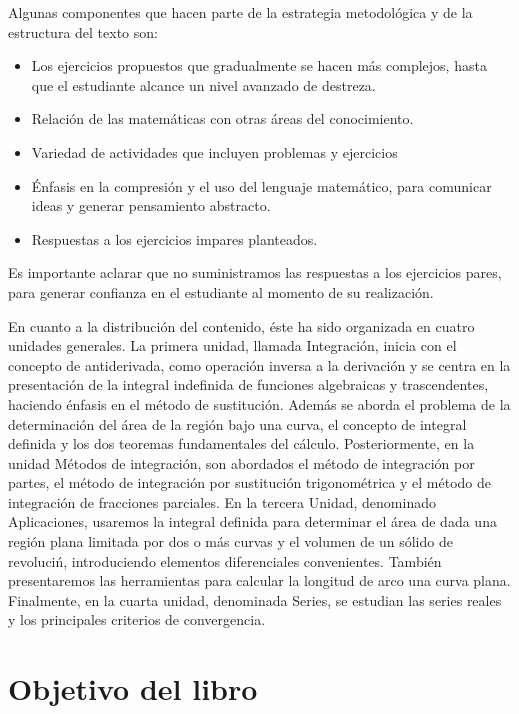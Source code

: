 Algunas componentes que hacen parte de la estrategia metodológica y de la estructura del texto son:
\begin{itemize}

 \item Los ejercicios propuestos  que gradualmente se hacen m\'as complejos, hasta que el estudiante alcance un nivel avanzado de destreza.
\item	Relaci\'on de las matem\'aticas con otras \'areas del conocimiento.
\item	Variedad de actividades que incluyen problemas y ejercicios
\item	\'Enfasis en la compresi\'on y el uso del lenguaje matem\'atico, para comunicar ideas y generar pensamiento abstracto.
\item	Respuestas a los ejercicios impares planteados. 
\end{itemize}

Es importante aclarar que no suministramos las respuestas a los ejercicios pares, para generar confianza en el estudiante al momento de su realización. 

En cuanto a la distribución del contenido, éste ha sido organizada en cuatro unidades generales. La primera unidad, llamada Integración, inicia con el concepto de antiderivada, como operaci\'on inversa a la derivaci\'on y se centra en la presentación de la integral
indefinida de funciones algebraicas y trascendentes, haciendo énfasis en el m\'etodo de sustituci\'on. Además se aborda el problema de la determinación del área de la región bajo una curva, el concepto de integral definida y los dos teoremas fundamentales del c\'alculo. Posteriormente, en la unidad M\'etodos de integraci\'on, son abordados el m\'etodo de integraci\'on por partes, el m\'etodo de integraci\'on por sustitución trigonométrica y el m\'etodo de integraci\'on de fracciones parciales. En la tercera Unidad, denominado Aplicaciones, usaremos la integral definida para determinar el área de dada una regi\'on plana limitada por dos o m\'as curvas y el volumen de un s\'olido de revoluci\'n, introduciendo elementos diferenciales convenientes. Tambi\'en presentaremos las herramientas para calcular la longitud de arco una curva plana. Finalmente, en la cuarta unidad, denominada Series, se estudian las series reales y los principales criterios de convergencia.


\section*{Objetivo del libro}

